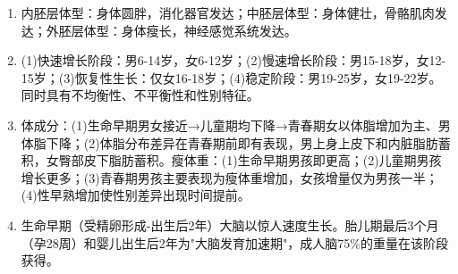 {\begin{enumerate}[leftmargin=*, itemsep=5pt]
    \item 内胚层体型：身体圆胖，消化器官发达；中胚层体型：身体健壮，骨骼肌肉发达；外胚层体型：身体瘦长，神经感觉系统发达。

    \item (1)快速增长阶段：男6-14岁，女6-12岁；(2)慢速增长阶段：男15-18岁，女12-15岁；(3)恢复性生长：仅女16-18岁；(4)稳定阶段：男19-25岁，女19-22岁。同时具有不均衡性、不平衡性和性别特征。

    \item 体成分：(1)生命早期男女接近→儿童期均下降→青春期女以体脂增加为主、男体脂下降；(2)体脂分布差异在青春期前即有表现，男上身上皮下和内脏脂肪蓄积，女臀部皮下脂肪蓄积。瘦体重：(1)生命早期男孩即更高；(2)儿童期男孩增长更多；(3)青春期男孩主要表现为瘦体重增加，女孩增量仅为男孩一半；(4)性早熟增加使性别差异出现时间提前。

    \item 生命早期（受精卵形成-出生后2年）大脑以惊人速度生长。胎儿期最后3个月（孕28周）和婴儿出生后2年为"大脑发育加速期"，成人脑75\%的重量在该阶段获得。
\end{enumerate}
}

\newpage
